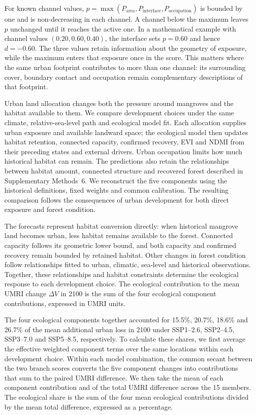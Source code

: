 For known channel values, $p=\max(P_{\mathrm{area}},P_{\mathrm{interface}},P_{\mathrm{occupation}})$ is bounded by one and is non-decreasing in each channel. A channel below the maximum leaves $p$ unchanged until it reaches the active one. In a mathematical example with channel values $(0.20,0.60,0.40)$, the interface sets $p=0.60$ and hence $d=-0.60$. The three values retain information about the geometry of exposure, while the maximum enters that exposure once in the score. This matters where the same urban footprint contributes to more than one channel: its surrounding cover, boundary contact and occupation remain complementary descriptions of that footprint.

Urban land allocation changes both the pressure around mangroves and the habitat available to them. We compare development choices under the same climate, relative-sea-level path and ecological model fit. Each allocation supplies urban exposure and available landward space; the ecological model then updates habitat retention, connected capacity, confirmed recovery, EVI and NDMI from their preceding states and external drivers. Urban occupation limits how much historical habitat can remain. The predictions also retain the relationships between habitat amount, connected structure and recovered forest described in Supplementary Methods~6. We reconstruct the five components using the historical definitions, fixed weights and common calibration. The resulting comparison follows the consequences of urban development for both direct exposure and forest condition.

The forecasts represent habitat conversion directly: when historical mangrove land becomes urban, less habitat remains available to the forest. Connected capacity follows its geometric lower bound, and both capacity and confirmed recovery remain bounded by retained habitat. Other changes in forest condition follow relationships fitted to urban, climatic, sea-level and historical observations. Together, these relationships and habitat constraints determine the ecological response to each development choice. The ecological contribution to the mean UMRI change $\Delta V$ in 2100 is the sum of the four ecological component contributions, expressed in UMRI units.

The four ecological components together accounted for 15.5\%, 20.7\%, 18.6\% and 26.7\% of the mean additional urban loss in 2100 under SSP1--2.6, SSP2--4.5, SSP3--7.0 and SSP5--8.5, respectively. To calculate these shares, we first average the effective weighted component terms over the same locations within each development choice. Within each model combination, the common secant between the two branch scores converts the five component changes into contributions that sum to the paired UMRI difference. We then take the mean of each component contribution and of the total UMRI difference across the 15 members. The ecological share is the sum of the four mean ecological contributions divided by the mean total difference, expressed as a percentage.

